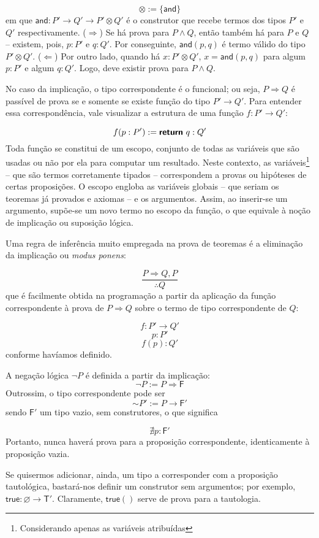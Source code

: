 $$\otimes := \{ \textsf{and} \}$$ em que $\textsf{and} : P' \to Q' \to P' \otimes Q'$ é o construtor que recebe termos dos tipos $P'$ e $Q'$ respectivamente. ($\Rightarrow$) Se há prova para $P \wedge Q$, então também há para $P$ e $Q$ -- existem, pois, $p:P'$ e $q:Q'$. Por conseguinte, $\textsf{and} (p, q)$ é termo válido do tipo $P' \otimes Q'$. ($\Leftarrow$) Por outro lado, quando há $x:P' \otimes Q'$, $x = \textsf{and} (p, q)$ para algum $p:P'$ e algum $q:Q'$. Logo, deve existir prova para $P \wedge Q$.

No caso da implicação, o tipo correspondente é o funcional; ou seja, $P \Rightarrow Q$ é passível de prova se e somente se existe função do tipo $P' \to Q'$. Para entender essa correspondência, vale visualizar a estrutura de uma função $f:P' \to Q'$:

$$f (p:P') := \textsf{\textbf{return} } q:Q'$$ Toda função se constitui de um escopo, conjunto de todas as variáveis que são usadas ou não por ela para computar um resultado. Neste contexto, as variáveis\footnote{Considerando apenas as variáveis atribuídas} -- que são termos corretamente tipados -- correspondem a provas ou hipóteses de certas proposições. O escopo engloba as variáveis globais -- que seriam os teoremas já provados e axiomas -- e os argumentos. Assim, ao inserir-se um argumento, supõe-se um novo termo no escopo da função, o que equivale à noção de implicação ou suposição lógica.

Uma regra de inferência muito empregada na prova de teoremas é a eliminação da implicação ou \textit{modus ponens}:

$$\frac{P \Rightarrow Q, P}{\therefore Q}$$ que é facilmente obtida na programação a partir da aplicação da função correspondente à prova de $P \Rightarrow Q$ sobre o termo de tipo correspondente de $Q$:

$$f:P' \to Q'$$ $$p:P'$$ $$f(p):Q'$$ conforme havíamos definido.

A negação lógica $\lnot P$ é definida a partir da implicação: $$\lnot P := P \Rightarrow \textsf{F}$$ Outrossim, o tipo correspondente pode ser $$\sim P' := P \to \textsf{F}'$$ sendo $\textsf{F}'$ um tipo vazio, sem construtores, o que significa

$$\nexists p : \textsf{F}'$$ Portanto, nunca haverá prova para a proposição correspondente, identicamente à proposição vazia.

Se quisermos adicionar, ainda, um tipo a corresponder com a proposição tautológica, bastará-nos definir um construtor sem argumentos; por exemplo, $\textsf{true}: \varnothing \to \textsf{T}'$. Claramente, $\textsf{true}()$ serve de prova para a tautologia.

